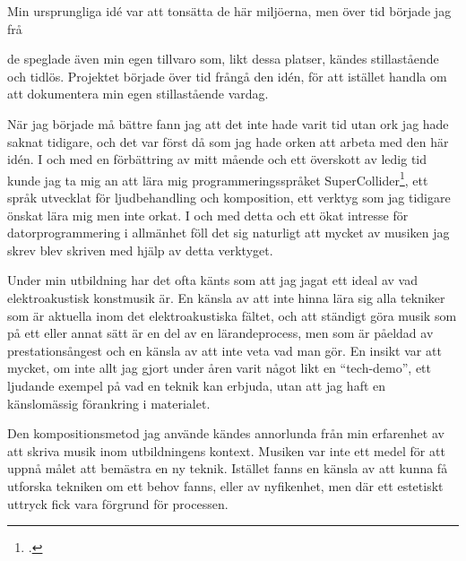 \documentclass{article}
\begin{document}
Min ursprungliga idé var att tonsätta de här miljöerna, men över tid började jag frå


de speglade även
min egen tillvaro som, likt dessa platser, kändes stillastående och tidlös. Projektet började över tid frångå
den idén, för att istället handla om att dokumentera min egen stillastående vardag.

När jag började må bättre fann jag att det inte hade varit tid utan ork jag hade saknat tidigare, och det var
först då som jag hade orken att arbeta med den här idén. I och med en förbättring av
mitt mående och ett överskott av ledig tid kunde jag ta mig an att lära mig programmeringsspråket 
SuperCollider\footcite{sc}, ett språk utvecklat för ljudbehandling och
komposition, ett verktyg som jag tidigare önskat lära mig men inte orkat. I och med detta och ett ökat
intresse för datorprogrammering i allmänhet föll det sig naturligt att mycket av musiken jag skrev blev
skriven med hjälp av detta verktyget.

Under min utbildning har det ofta känts som att jag jagat ett ideal av vad elektroakustisk konstmusik är. En
känsla av att inte hinna lära sig alla tekniker som är aktuella inom det elektroakustiska fältet, och att
ständigt göra musik som på ett eller annat sätt är en del av en lärandeprocess, men som är påeldad av
prestationsångest och en känsla av att inte veta vad man gör. En insikt var att mycket, om inte allt jag gjort
under åren varit något likt en ``tech-demo'', ett ljudande exempel på vad en teknik kan erbjuda, utan att jag
haft en känslomässig förankring i materialet.

Den kompositionsmetod jag använde kändes annorlunda från min erfarenhet av att skriva musik inom
utbildningens kontext. Musiken var inte ett medel för att uppnå målet att bemästra en ny teknik. Istället
fanns en känsla av att kunna få utforska tekniken om ett behov fanns, eller av nyfikenhet, men där ett
estetiskt uttryck fick vara förgrund för processen. 



\end{document}
